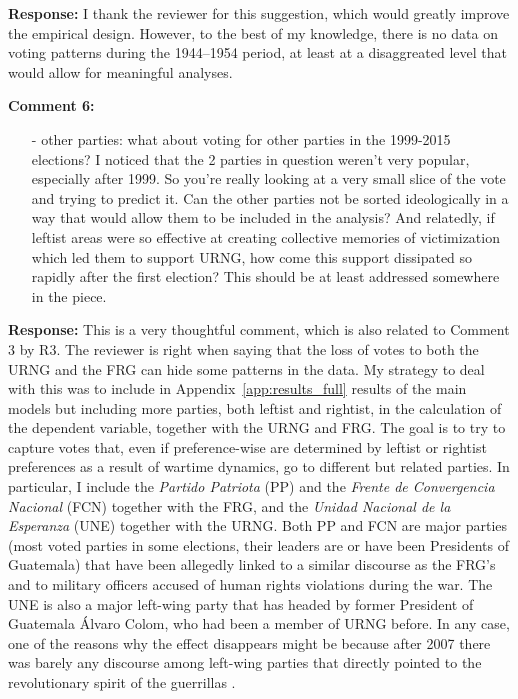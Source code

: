 \documentclass[12pt, a4paper, notitlepage]{article}
\begin{document}
\noindent\textbf{Response:} I thank the reviewer for this suggestion, which would greatly improve the empirical design. However, to the best of my knowledge, there is no data on voting patterns during the 1944--1954 period, at least at a disaggreated level that would allow for meaningful analyses.

\vspace{15pt}
\noindent\textbf{Comment 6:}
\begin{displayquote}
\begin{itemize}
\item[-] other parties: what about voting for other parties in the 1999-2015 elections? I noticed that the 2 parties in question weren’t very popular, especially after 1999. So you’re really looking at a very small slice of the vote and trying to predict it. Can the other parties not be sorted ideologically in a way that would allow them to be included in the analysis? And relatedly, if leftist areas were so effective at creating collective memories of victimization which led them to support URNG, how come this support dissipated so rapidly after the first election? This should be at least addressed somewhere in the piece.
\end{itemize}
\end{displayquote}

\noindent\textbf{Response:} This is a very thoughtful comment, which is also related to Comment 3 by R3. The reviewer is right when saying that the loss of votes to both the URNG and the FRG can hide some patterns in the data. My strategy to deal with this was to include in Appendix~\ref{app:results_full} results of the main models but including more parties, both leftist and rightist, in the calculation of the dependent variable, together with the URNG and FRG.
The goal is to try to capture votes that, even if preference-wise are determined by leftist or rightist preferences as a result of wartime dynamics, go to different but related parties.
In particular, I include the \textit{Partido Patriota} (PP) and the \textit{Frente de Convergencia Nacional} (FCN) together with the FRG, and the \textit{Unidad Nacional de la Esperanza} (UNE) together with the URNG.
Both PP and FCN are major parties (most voted parties in some elections, their leaders are or have been Presidents of Guatemala) that have been allegedly linked to a similar discourse as the FRG's and to military officers accused of human rights violations during the war.
The UNE is also a major left-wing party that has headed by former President of Guatemala Álvaro Colom, who had been a member of URNG before.
In any case, one of the reasons why the effect disappears might be because after 2007 there was barely any discourse among left-wing parties that directly pointed to the revolutionary spirit of the guerrillas \citep{Ibarra:2008to}.
\end{document}
